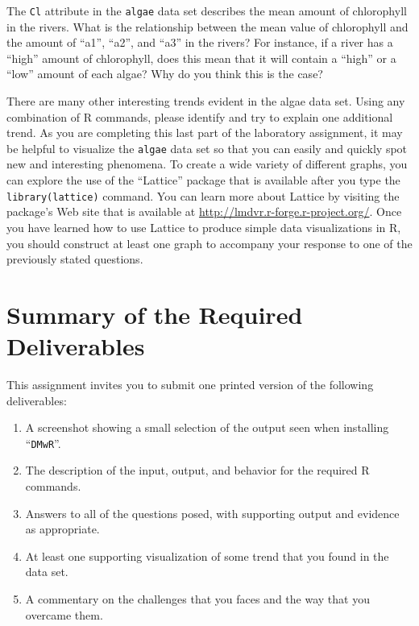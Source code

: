 The {\tt Cl} attribute in the {\tt algae} data set describes the mean amount of chlorophyll in the rivers. What is the
relationship between the mean value of chlorophyll and the amount of ``a1'', ``a2'', and ``a3'' in the rivers?
For instance, if a river has a ``high'' amount of chlorophyll, does this mean that it will contain a ``high'' or a
``low'' amount of each algae? Why do you think this is the case?

There are many other interesting trends evident in the algae data set. Using any combination of R commands, please
identify and try to explain one additional trend. As you are completing this last part of the laboratory assignment, it
may be helpful to visualize the {\tt algae} data set so that you can easily and quickly spot new and interesting
phenomena. To create a wide variety of different graphs, you can explore the use of the ``Lattice'' package that is
available after you type the {\tt library(lattice)} command. You can learn more about Lattice by visiting the package's
Web site that is available at \url{http://lmdvr.r-forge.r-project.org/}. Once you have learned how to use Lattice to
produce simple data visualizations in R, you should construct at least one graph to accompany your response to one of
the previously stated questions.


\section*{Summary of the Required Deliverables}

  This assignment invites you to submit one printed version of the following deliverables:

  \vspace*{-.05in}
  \begin{enumerate}
    \setlength{\itemsep}{0pt}
    \item A screenshot showing a small selection of the output seen when installing ``{\tt DMwR}''.
    \item The description of the input, output, and behavior for the required R commands.
    \item Answers to all of the questions posed, with supporting output and evidence as appropriate. 
    \item At least one supporting visualization of some trend that you found in the data set. 
    \item A commentary on the challenges that you faces and the way that you overcame them.
  \end{enumerate}


